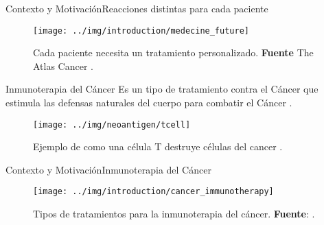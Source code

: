 \documentclass[10pt]{beamer}
\newcommand{\1}{
	\setbeamertemplate{background}{
		\texttt{[image: img/1]}
		\tikz[overlay] \fill[fill opacity=0.75,fill=white] (0,0) rectangle (-\paperwidth,\paperheight);
	}
}
\begin{document}
\begin{frame}{Contexto y Motivación}{Reacciones distintas para cada paciente}

	
	\begin{figure}[]
		\centering
		\texttt{[image: ../img/introduction/medecine\_future]}
		\caption{Cada paciente necesita un tratamiento personalizado. \textbf{Fuente} The Atlas Cancer \cite{pdx2023}.}
	\end{figure}
\end{frame}












\begin{frame}{Inmunoterapia del Cáncer}{}		
	Es un tipo de tratamiento contra el Cáncer que estimula las defensas naturales del cuerpo para combatir el Cáncer \cite{inmunoterapy2022}.
		
	\begin{figure}
		\texttt{[image: ../img/neoantigen/tcell]}
		\caption{Ejemplo de como una célula T destruye células del cancer \cite{nortshore2022}.}
	\end{figure}		
\end{frame}


\begin{frame}{Contexto y Motivación}{Inmunoterapia del Cáncer}
	
	
	\begin{figure}[]
		\centering
		\texttt{[image: ../img/introduction/cancer\_immunotherapy]}
		\caption{Tipos de tratamientos para la inmunoterapia del cáncer. \textbf{Fuente}: \cite{kciuk2023recent}.}
	\end{figure}
\end{frame}
\end{document}
